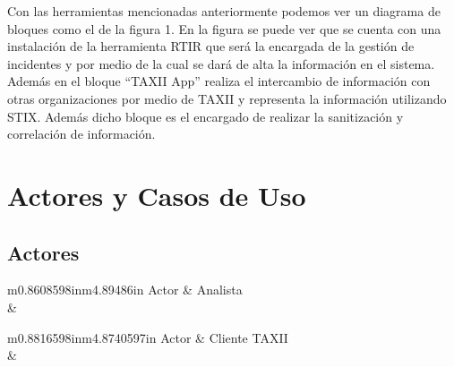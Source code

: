 \documentclass[11pt]{article}
\begin{document}
\bigskip

{
Con las herramientas mencionadas anteriormente podemos ver un diagrama de bloques como el de la figura 1. En la figura
se puede ver que se cuenta con una instalación de la herramienta RTIR que será la encargada de la gestión de incidentes
y por medio de la cual se dará de alta la información en el sistema. Además en el bloque ``TAXII App'' realiza el
intercambio de información con otras organizaciones por medio de TAXII y representa la información utilizando STIX.
Además dicho bloque es el encargado de realizar la sanitización y correlación de información.}


\bigskip


\bigskip

\section{Actores y Casos de Uso}
\subsection{Actores}

\bigskip

\begin{flushleft}
\tablefirsthead{}
\tablehead{}
\tabletail{}
\tablelasttail{}
\begin{supertabular}{m{0.8608598in}m{4.89486in}}
{ Actor} &
{ Analista}\\\hline
{} &
\\
\end{supertabular}
\end{flushleft}

\bigskip


\bigskip

\begin{flushleft}
\tablefirsthead{}
\tablehead{}
\tabletail{}
\tablelasttail{}
\begin{supertabular}{m{0.8816598in}m{4.8740597in}}
{ Actor} &
{ Cliente TAXII}\\\hline
{} &
\\
\end{supertabular}
\end{flushleft}
\end{document}
